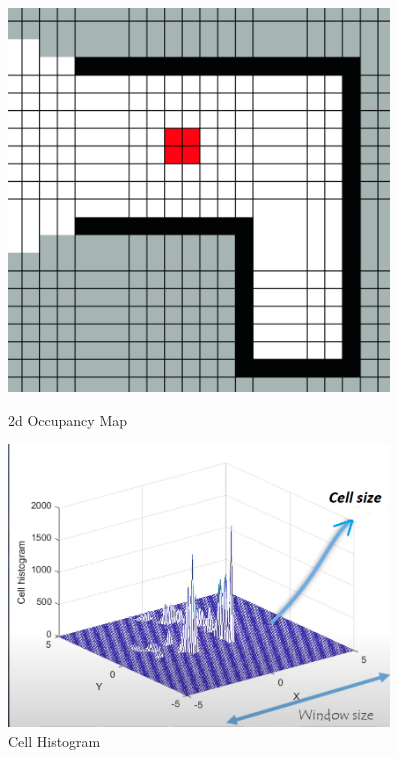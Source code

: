 \begin{figure}[h]
    \centering
    \begin{minipage}{0.4\textwidth}
        \centering
        \includegraphics[width=0.9\textwidth]{Figures/2d Occupancy map.PNG} %
        \caption{2d Occupancy Map \cite{Wang2018}}
        \label{fig:2d Occupancy Map}    
    \end{minipage}\hfill
    \begin{minipage}{0.5\textwidth}
        \centering
        \includegraphics[width=0.9\textwidth]{Figures/cell histogram.PNG} 
        \caption{Cell Histogram \cite{Cellhistogram}} 
        \label{fig:cell histogram}
    \end{minipage}
\end{figure}

